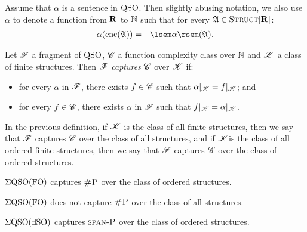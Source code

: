 
Assume that $\alpha$ is a sentence in ${\rm QSO}$. Then slightly abusing notation, we also use $\alpha$ to denote a function from $\mathbf{R}$ to $\mathbb{N}$ such that for every $\mathfrak{A} \in \text{\sc Struct}[\mathbf{R}] $:
\begin{eqnarray*}
\alpha(\enc(\A)) & = & \sem{\alpha}(\A).
\end{eqnarray*}
\begin{definition}
Let $\mathscr{F}$ a fragment of ${\rm QSO}$, $\mathscr{C}$ a function complexity class over $\mathbb{N}$ and $\mathscr{K}$ a class of finite structures. Then $\mathscr{F}$ {\em captures} $\mathscr{C}$ over $\mathscr{K}$ if:
\begin{itemize}
\item for every $\alpha$ in $\mathscr{F}$, there exists $f \in \mathscr{C}$ such that $\alpha|_{\mathscr{K}} = f|_{\mathscr{K}}$; and

\item for every $f \in \mathscr{C}$, there exists $\alpha$ in $\mathscr{F}$ such that $f|_{\mathscr{K}} = \alpha|_{\mathscr{K}}$.
\end{itemize}
\end{definition}
In the previous definition, if $\mathscr{K}$ is the class of all finite structures, then we say that $\mathscr{F}$ captures $\mathscr{C}$ over the class of all structures, and if $\mathscr{K}$is the class of all ordered finite structures, then we say that $\mathscr{F}$ captures $\mathscr{C}$ over the class of ordered structures. 


\begin{theorem}
$\Sigma{\rm QSO}({\rm FO})$ captures $\text{\sc \#P}$ over the class of ordered structures.
\end{theorem}

\begin{proposition}
$\Sigma{\rm QSO}({\rm FO})$ does not capture $\text{\sc \#P}$ over the class of all structures.
\end{proposition}



\begin{theorem}
$\Sigma{\rm QSO}(\exists{\rm SO})$ captures $\text{\sc span-P}$ over the class of ordered structures.
\end{theorem}
